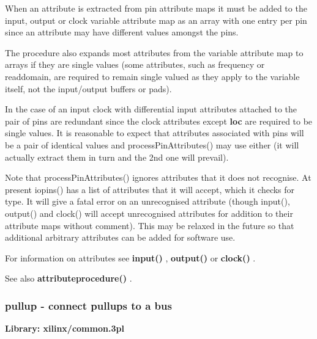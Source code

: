             When an attribute is extracted from pin attribute maps it must be added
            to the input, output or clock variable attribute map as an array with
            one entry per pin since an attribute may have different values amongst
            the pins.           
            
            The procedure also expands most attributes from the variable attribute
            map to arrays if they are single values (some attributes, such as
            frequency or readdomain, are required to remain single valued as they apply
            to the variable itself, not the input/output buffers or pads).
            
            In the case of an input clock with differential input attributes
            attached to the pair of pins are redundant since the clock attributes
            except {\bf loc} are required to be single values. It is reasonable
            to expect that attributes associated with pins will be a pair of identical
            values and processPinAttributes() may use either (it will actually
            extract them in turn and the 2nd one will prevail).
            
            Note that processPinAttributes() ignores attributes that it does not
            recognise. At present iopins() has a list of attributes that it will
            accept, which it checks for type. It will give a fatal error on an
            unrecognised attribute (though input(), output() and clock() will
            accept unrecognised attributes for addition to their attribute maps
            without comment). This may be relaxed in the future so that additional
            arbitrary attributes can be added for software use.
            
            For information on attributes see {\bf input()} ,
            {\bf output()}  or {\bf clock()}
            .
            
            See also {\bf attributeprocedure()} .



        \subsubsection{pullup - connect pullups to a bus}\label{sec:lppullup}
            
            {\bf Library: xilinx/common.3pl}

